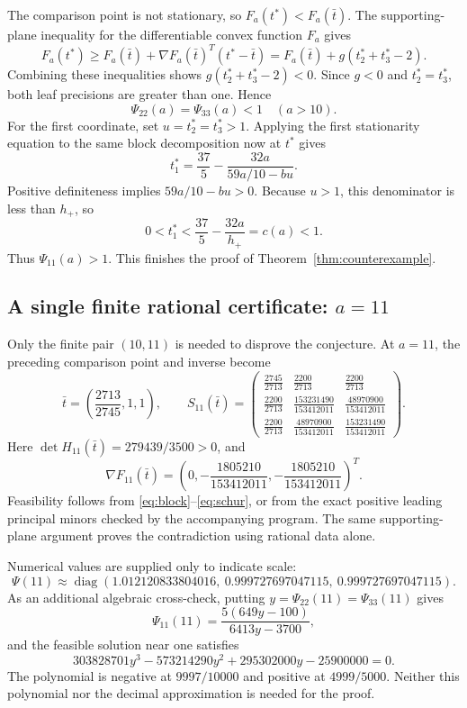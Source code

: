 \documentclass[11pt]{article}
\theoremstyle{remark}\newtheorem{remark}[theorem]{Remark}
\DeclareMathOperator{\diag}{diag}
\begin{document}
The comparison point is not stationary, so $F_a(t^*)<F_a(\bar t)$. The supporting-plane inequality for the differentiable convex function $F_a$ gives
\[
F_a(t^*)\geq F_a(\bar t)+\nabla F_a(\bar t)^T(t^*-\bar t)
=F_a(\bar t)+g(t_2^*+t_3^*-2).
\]
Combining these inequalities shows $g(t_2^*+t_3^*-2)<0$. Since $g<0$ and $t_2^*=t_3^*$, both leaf precisions are greater than one. Hence
\begin{equation}\label{eq:leaf-conclusion}
\Psi_{22}(a)=\Psi_{33}(a)<1\quad(a>10).
\end{equation}
For the first coordinate, set $u=t_2^*=t_3^*>1$. Applying the first stationarity equation to the same block decomposition now at $t^*$ gives
\[
t_1^*=\frac{37}{5}-\frac{32a}{59a/10-bu}.
\]
Positive definiteness implies $59a/10-bu>0$. Because $u>1$, this denominator is less than $h_+$, so
\[
0<t_1^*<\frac{37}{5}-\frac{32a}{h_+}=c(a)<1.
\]
Thus $\Psi_{11}(a)>1$. This finishes the proof of Theorem~\ref{thm:counterexample}.

\subsection{A single finite rational certificate: \texorpdfstring{$a=11$}{a=11}}
Only the finite pair $(10,11)$ is needed to disprove the conjecture. At $a=11$, the preceding comparison point and inverse become
\begin{equation}\label{eq:11-certificate}
\bar t=\left(\frac{2713}{2745},1,1\right),\qquad
S_{11}(\bar t)=
\begin{pmatrix}
\frac{2745}{2713}&\frac{2200}{2713}&\frac{2200}{2713}\\[3pt]
\frac{2200}{2713}&\frac{153231490}{153412011}&\frac{48970900}{153412011}\\[3pt]
\frac{2200}{2713}&\frac{48970900}{153412011}&\frac{153231490}{153412011}
\end{pmatrix}.
\end{equation}
Here $\det H_{11}(\bar t)=279439/3500>0$, and
\[
\nabla F_{11}(\bar t)=
\left(0,-\frac{1805210}{153412011},-\frac{1805210}{153412011}\right)^T.
\]
Feasibility follows from \eqref{eq:block}--\eqref{eq:schur}, or from the exact positive leading principal minors checked by the accompanying program. The same supporting-plane argument proves the contradiction using rational data alone.

Numerical values are supplied only to indicate scale:
\begin{equation}\label{eq:numerical}
\Psi(11)\approx\diag(1.012120833804016,\ 0.999727697047115,\ 0.999727697047115).
\end{equation}
As an additional algebraic cross-check, putting $y=\Psi_{22}(11)=\Psi_{33}(11)$ gives
\[
\Psi_{11}(11)=\frac{5(649y-100)}{6413y-3700},
\]
and the feasible solution near one satisfies
\[
303828701y^3-573214290y^2+295302000y-25900000=0.
\]
The polynomial is negative at $9997/10000$ and positive at $4999/5000$. Neither this polynomial nor the decimal approximation is needed for the proof.
\end{document}
